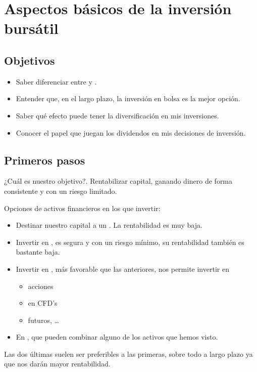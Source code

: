 \chapter{Aspectos básicos de la inversión bursátil}

\section{Objetivos}

\begin{itemize}
    \item Saber diferenciar entre  y .
    \item Entender que, en el largo plazo, la inversión en bolsa es la mejor opción.
    \item Saber qué efecto puede tener la diversificación en mis inversiones.
    \item Conocer el papel que juegan los dividendos en mis decisiones de inversión.
\end{itemize}

\section{Primeros pasos}

¿Cuál es nuestro objetivo?. Rentabilizar capital, ganando dinero de forma consistente y con un riesgo limitado.

Opciones de activos financieros en los que invertir:
\begin{itemize}
    \item Destinar nuestro capital a un . La rentabilidad es muy baja.
    \item Invertir en , es segura y con un riesgo mínimo, su rentabilidad también es bastante baja.
    \item Invertir en , más favorable que las anteriores, nos permite invertir en
    \begin{itemize}
        \item acciones
        \item en CFD's
        \item futuros, \ldots
    \end{itemize}
    \item En , que pueden combinar alguno de los activos que hemos visto.
\end{itemize}

Las dos últimas suelen ser preferibles a las primeras, sobre todo a largo plazo ya que nos darán mayor rentabilidad.

